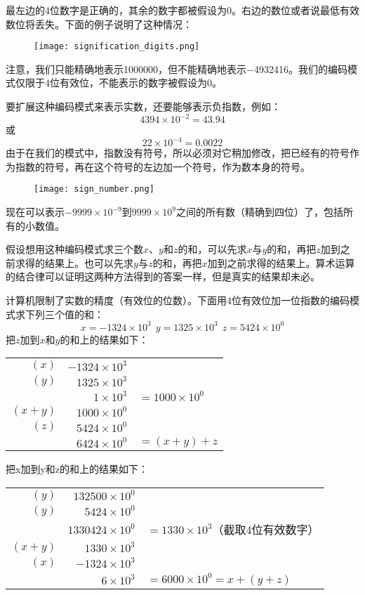 最左边的4位数字是正确的，其余的数字都被假设为0。右边的数位或者说最低有效数位将丢失。下面的例子说明了这种情况：

\begin{figure}[htbp]
\centering
\texttt{[image: signification\_digits.png]}
\end{figure}

注意，我们只能精确地表示1000000，但不能精确地表示$-$4932416。我们的编码模式仅限于4位有效位，不能表示的数字被假设为0。

要扩展这种编码模式来表示实数，还要能够表示负指数，例如：
\[ 4394\times 10^{-2}=43.94\]
或
\[22×10^{-4}=0.0022\]
由于在我们的模式中，指数没有符号，所以必须对它稍加修改，把已经有的符号作为指数的符号，再在这个符号的左边加一个符号，作为数本身的符号。

\begin{figure}[htbp]
\centering
\texttt{[image: sign\_number.png]}
\end{figure}
现在可以表示$-9999×10^{-9}$到$9999×10^9$之间的所有数（精确到四位）了，包括所有的小数值。

假设想用这种编码模式求三个数$x$、$y$和$z$的和，可以先求$x$与$y$的和，再把$z$加到之前求得的结果上。也可以先求$y$与$z$的和，再把$x$加到之前求得的结果上。算术运算的结合律可以证明这两种方法得到的答案一样，但是真实的结果却未必。

计算机限制了实数的精度（有效位的位数）。下面用4位有效位加一位指数的编码模式求下列三个值的和：
\[ x=-1324\times 10^3~~y=1325\times 10^3~~z=5424\times 10^0\]
把$z$加到$x$和$y$的和上的结果如下：

\begin{table}[htbp]
\centering
\begin{tabular}{rrl}
$(x)$		& $-1324\times 10^3$ & 					\\
$(y)$		& $1325\times 10^3$	& 					\\
\hline
			& $1\times 10^3$		& $=1000\times 10^0$	\\
$(x+y)$	& $1000\times 10^0$	& 					\\
$(z)$		& $5424\times 10^0$	&					\\
\hline
			& $6424\times 10^0$	& $=(x+y)+z$	\\
\end{tabular}
\end{table}

把x加到y和z的和上的结果如下：

\begin{table}[htbp]
\centering
\begin{tabular}{rrl}
$(y)$		& $132500\times 10^0$	& 								\\
$(y)$		& $5424\times 10^0$		& 								\\
\hline
			& $1330424\times 10^0$	& $=1330\times 10^3$（截取4位有效数字）	\\
$(x+y)$	& $1330\times 10^3$	& 					\\
$(x)$		& $-1324\times 10^3$	&					\\
\hline
			& $6\times 10^3$	& $=6000\times 10^0=x+(y+z)$	\\
\end{tabular}
\end{table}


